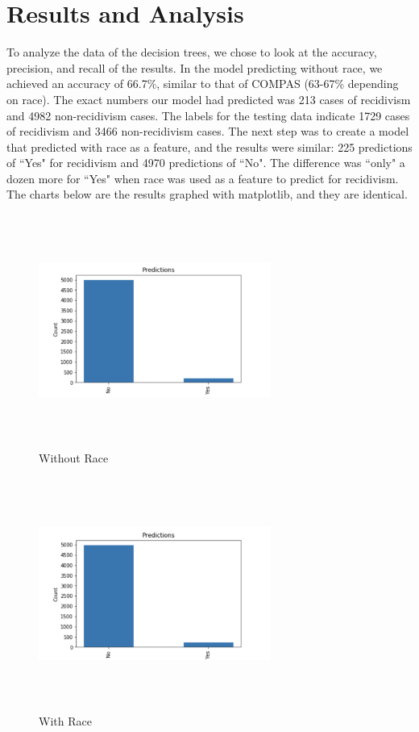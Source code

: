 \documentclass[11pt, sigconf]{acmart}
\begin{document}
\section{Results and Analysis}
To analyze the data of the decision trees, we chose to look at the accuracy, precision, and recall of the results. In the model predicting without race, we achieved an accuracy of 66.7\%, similar to that of COMPAS (63-67\% depending on race). The exact numbers our model had predicted was 213 cases of recidivism and 4982 non-recidivism cases. The labels for the testing data indicate 1729 cases of recidivism and 3466 non-recidivism cases. The next step was to create a model that predicted with race as a feature, and the results were similar: 225 predictions of ``Yes" for recidivism and 4970 predictions of ``No". The difference was ``only" a dozen more for ``Yes" when race was used as a feature to predict for recidivism. The charts below are the results graphed with matplotlib, and they are identical. 


\begin{figure}[h] 	
\centering
\includegraphics[width=3in,height=3in]{2.png}
\caption{Without Race}
\end{figure}

\begin{figure}[h] 	
\centering
\includegraphics[width=3in,height=3in]{3.png}
\caption{With Race}
\end{figure}
\end{document}
